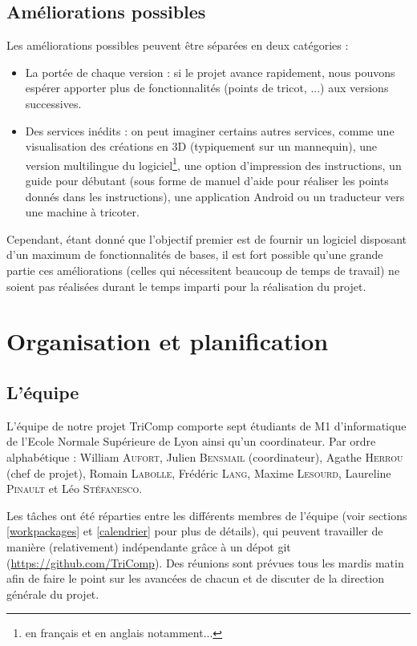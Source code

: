 \documentclass{article}
\begin{document}
\subsection{Améliorations possibles}

Les améliorations possibles peuvent être séparées en deux catégories :
\begin{itemize}
   \item La portée de chaque version : si le projet avance rapidement, nous pouvons espérer apporter plus de fonctionnalités (points 
de tricot, ...) aux versions successives. 
   \item Des services inédits : on peut imaginer certains autres services, comme une visualisation des créations 
en 3D (typiquement sur un mannequin), une version multilingue du logiciel\footnote{en français et en anglais notamment...}, une option 
d'impression des instructions, un guide pour débutant (sous forme de manuel d'aide pour réaliser les points donnés dans les instructions), 
une application Android ou un traducteur vers une machine à tricoter.
\end{itemize}
Cependant, étant donné que l'objectif premier est de fournir un logiciel disposant d'un maximum de fonctionnalités de bases, il est fort 
possible qu'une grande partie ces améliorations (celles qui nécessitent beaucoup de temps de travail) ne soient pas réalisées durant le 
temps imparti pour la réalisation du projet.


\section{Organisation et planification}

\subsection{L'équipe}

L'équipe de notre projet TriComp comporte sept étudiants de M1 d'informatique de l'Ecole Normale Supérieure de Lyon ainsi qu'un coordinateur. Par ordre alphabétique : William \textsc{Aufort}, 
Julien \textsc{Bensmail} (coordinateur), Agathe \textsc{Herrou} (chef de projet), Romain \textsc{Labolle}, Frédéric \textsc{Lang}, Maxime 
\textsc{Lesourd}, Laureline \textsc{Pinault} et Léo \textsc{Stéfanesco}. \newline

Les tâches ont été réparties entre les différents membres de l'équipe (voir sections \ref{workpackages} et \ref{calendrier} pour plus de détails), qui peuvent travailler de manière (relativement) indépendante grâce à un dépot git (\url{https://github.com/TriComp}). Des réunions sont prévues tous les mardis matin afin de faire le point sur les avancées de chacun et de discuter de la direction générale du projet.
\end{document}
